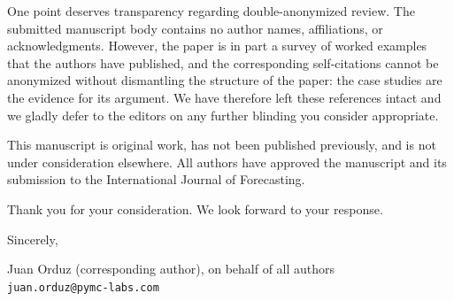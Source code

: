 \documentclass[11pt]{article}
\begin{document}
One point deserves transparency regarding double-anonymized review. The submitted manuscript body contains no author names, affiliations, or acknowledgments. However, the paper is in part a survey of worked examples that the authors have published, and the corresponding self-citations cannot be anonymized without dismantling the structure of the paper: the case studies are the evidence for its argument. We have therefore left these references intact and we gladly defer to the editors on any further blinding you consider appropriate.

This manuscript is original work, has not been published previously, and is not under consideration elsewhere. All authors have approved the manuscript and its submission to the International Journal of Forecasting.

Thank you for your consideration. We look forward to your response.

\vspace{1em}

Sincerely,

Juan Orduz (corresponding author), on behalf of all authors\\
\texttt{juan.orduz@pymc-labs.com}
\end{document}
